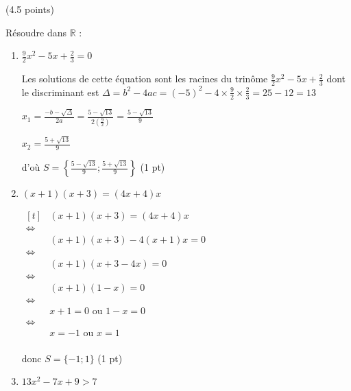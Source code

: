 \documentclass[a4paper,11pt]{article}
\theoremstyle{break}
\begin{document}
  \begin{exo}(4.5 points)
  
   Résoudre dans $\mathbb{R}$ :
   \begin{enumerate}
   
       \item $\frac{9}{2}x^2-5 x+\frac{2}{3}=0$
    
\begin{correction}
 
 Les solutions de cette \'equation sont les racines du trin\^ome $\frac{9}{2}x^2-5 x+\frac{2}{3}$
 dont le discriminant est $\Delta=b^2-4ac=(-5)^2-4\times \frac{9}{2} \times \frac{2}{3}=25-12=13$
    
    $x_1=\frac{-b-\sqrt{\Delta}}{2a}=\frac{5-\sqrt{13}}{2(\frac{9}{2})}=\frac{5-\sqrt{13}}{9}$
    
    $x_2=\frac{5+\sqrt{13}}{9}$
    
    d'o\`u $S=\left \{\frac{5-\sqrt{13}}{9};\frac{5+\sqrt{13}}{9}\right \}$ (1 pt)
 
\end{correction}
   
    \item $(x+1)(x+3)=(4x+4)x$
    
\begin{correction}

$\begin{aligned}[t]
           & (x+1)(x+3)=(4x+4)x \\
      \iff \\
           & (x+1)(x+3)-4(x+1)x=0\\
      \iff \\
           & (x+1)(x+3-4x)=0\\
      \iff  \\
           &(x+1)(1-x)=0\\
      \iff  \\
          &x+1=0 \textrm{ ou } 1-x=0\\    
      \iff  \\
          &x=-1 \textrm{ ou } x=1\\      
\end{aligned}$
    
donc $S=\{-1;1\}$ (1 pt)
 
\end{correction}  
    
 
    \item $13 x^2-7 x+9>7$


\end{enumerate}
\end{exo}
\end{document}
